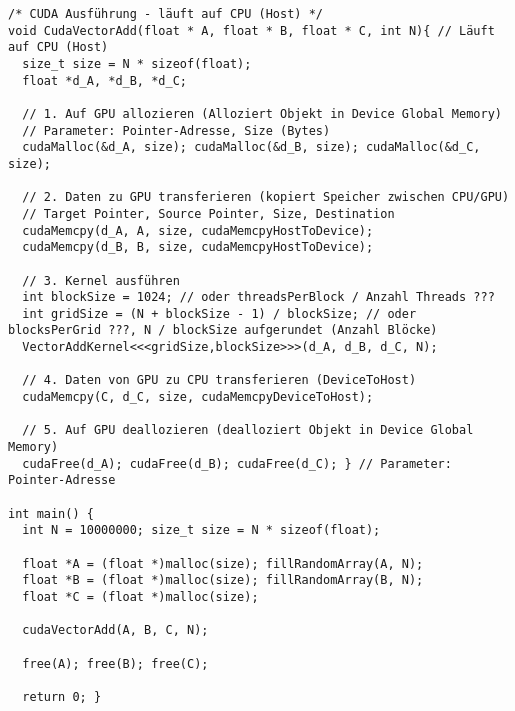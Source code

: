 \begin{lstlisting}
/* CUDA Ausführung - läuft auf CPU (Host) */
void CudaVectorAdd(float * A, float * B, float * C, int N){ // Läuft auf CPU (Host)
  size_t size = N * sizeof(float);
  float *d_A, *d_B, *d_C;

  // 1. Auf GPU allozieren (Alloziert Objekt in Device Global Memory)
  // Parameter: Pointer-Adresse, Size (Bytes)
  cudaMalloc(&d_A, size); cudaMalloc(&d_B, size); cudaMalloc(&d_C, size);

  // 2. Daten zu GPU transferieren (kopiert Speicher zwischen CPU/GPU)
  // Target Pointer, Source Pointer, Size, Destination
  cudaMemcpy(d_A, A, size, cudaMemcpyHostToDevice);
  cudaMemcpy(d_B, B, size, cudaMemcpyHostToDevice);

  // 3. Kernel ausführen
  int blockSize = 1024; // oder threadsPerBlock / Anzahl Threads ???
  int gridSize = (N + blockSize - 1) / blockSize; // oder blocksPerGrid ???, N / blockSize aufgerundet (Anzahl Blöcke)
  VectorAddKernel<<<gridSize,blockSize>>>(d_A, d_B, d_C, N);

  // 4. Daten von GPU zu CPU transferieren (DeviceToHost)
  cudaMemcpy(C, d_C, size, cudaMemcpyDeviceToHost);

  // 5. Auf GPU deallozieren (dealloziert Objekt in Device Global Memory)
  cudaFree(d_A); cudaFree(d_B); cudaFree(d_C); } // Parameter: Pointer-Adresse

int main() {
  int N = 10000000; size_t size = N * sizeof(float);

  float *A = (float *)malloc(size); fillRandomArray(A, N);
  float *B = (float *)malloc(size); fillRandomArray(B, N);
  float *C = (float *)malloc(size);

  cudaVectorAdd(A, B, C, N);

  free(A); free(B); free(C);

  return 0; }
\end{lstlisting}

